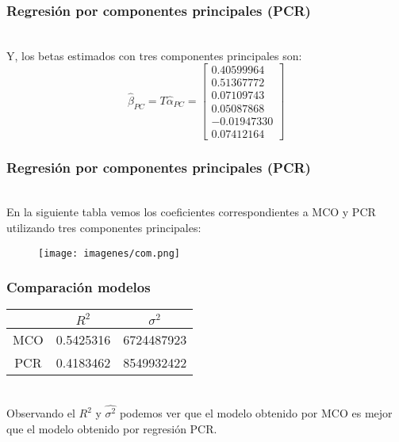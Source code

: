 \documentclass[12pt]{beamer}
\begin{document}
\begin{frame}
\frametitle{Regresión por componentes principales (PCR)}
~\\Y, los betas estimados con tres componentes principales son:
$$\hat{\beta}_{PC}=T\hat{\alpha}_{PC}=\left[\begin{matrix}
 0.40599964 \\ 
 0.51367772 \\ 
 0.07109743 \\ 
 0.05087868 \\ 
 -0.01947330 \\ 
 0.07412164
 \end{matrix}\right]$$
\end{frame}

\begin{frame}
\frametitle{Regresión por componentes principales (PCR)}
~\\En la siguiente tabla vemos los coeficientes correspondientes a MCO y PCR utilizando tres componentes principales:
\begin{figure}[!h]
    \begin{center}
        \texttt{[image: imagenes/com.png]}
        \label{fig:Densidad}
    \end{center}
\end{figure}
\end{frame}

\begin{frame}
\frametitle{Comparación modelos}
\begin{center}
\begin{tabular}{|ccc|}
\hline 
 & $R^2$ & $\sigma^2$ \\ 
\hline 
MCO & 0.5425316 & 6724487923 \\ 
\hline 
PCR & 0.4183462 & 8549932422 \\ 
\hline 
\end{tabular} 
\end{center}
~\\Observando el $R^2$ y $\hat{\sigma^2}$ podemos ver que el modelo obtenido por MCO es mejor que el modelo obtenido por regresión PCR.
\end{frame}
\end{document}
